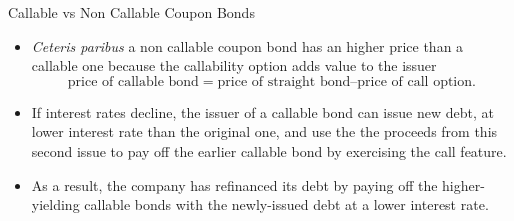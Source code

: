 \documentclass{beamer}
\begin{document}
	\begin{frame}{Callable vs Non Callable Coupon Bonds}
		\begin{itemize}
			\item<1-> \emph{Ceteris paribus} a non callable coupon bond has an higher price than a callable one because the callability option adds value to the issuer
			\begin{equation*}
				\text{price of callable bond} = \text{price of straight bond} – \text{price of call option}.
			\end{equation*}
			\item<2-> If interest rates decline, the issuer of a callable bond can issue new debt, at lower interest rate than the original one, and use the the proceeds from this second issue to pay off the earlier callable bond by exercising the call feature.
			\item<2-> As a result, \textcolor{maincolor}{the company has refinanced its debt by paying off the higher-yielding callable bonds with the newly-issued debt at a lower interest rate}.
		\end{itemize}
	\end{frame}

\end{document}
